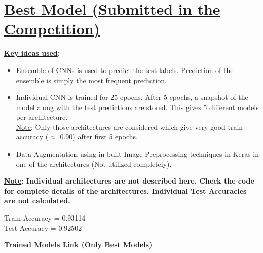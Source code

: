\documentclass[12pt]{article}
\begin{document}
\section*{\underline{Best Model (Submitted in the Competition)}}
\begin{addmargin}[0.3in]{0in}
\textbf{\underline{Key ideas used}: }
\begin{itemize}
    \item Ensemble of CNNs is used to predict the test labels. Prediction of the ensemble is simply the most frequent prediction.
    \item Individual CNN is trained for 25 epochs. After 5 epochs, a snapshot of the model along with the test predictions are stored. This gives 5 different models per architecture. \\
    \underline{Note}: Only those architectures are considered which give very good train accuracy ($\approx$ 0.90) after first 5 epochs.
    \item Data Augmentation using in-built Image Preprocessing techniques in Keras in one of the architectures (Not utilized completely).
\end{itemize}
\textbf{\underline{Note}: Individual architectures are not described here. Check the code for complete details of the architectures. Individual Test Accuracies are not calculated.} \\
\begin{tabbing}
Train Accuracy \= = 0.93114 \\
Test Accuracy \> = 0.92502 \\
\end{tabbing}
\end{addmargin}
\href{https://drive.google.com/open?id=1b1Mlf0uJbquCTcqg5KEtlgwKFtO94prZ}{\textbf{Trained Models Link (Only Best Models)}} \\
\end{document}
